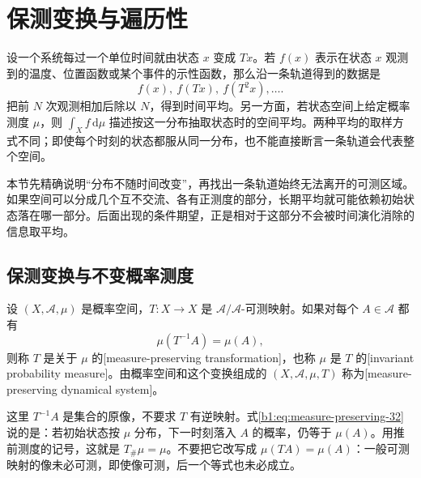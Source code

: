 \section{保测变换与遍历性}
\label{b1:sec:3201}

设一个系统每过一个单位时间就由状态 \(x\) 变成 \(Tx\)。若 \(f(x)\) 表示在状态 \(x\) 观测到的温度、位置函数或某个事件的示性函数，那么沿一条轨道得到的数据是
\[
 f(x),\ f(Tx),\ f(T^2x),\ldots.
\]
把前 \(N\) 次观测相加后除以 \(N\)，得到时间平均。另一方面，若状态空间上给定概率测度 \(\mu\)，则 \(\int_X f\,\mathrm d\mu\) 描述按这一分布抽取状态时的空间平均。两种平均的取样方式不同；即使每个时刻的状态都服从同一分布，也不能直接断言一条轨道会代表整个空间。

\ProseParagraphBreak

本节先精确说明“分布不随时间改变”，再找出一条轨道始终无法离开的可测区域。如果空间可以分成几个互不交流、各有正测度的部分，长期平均就可能依赖初始状态落在哪一部分。后面出现的条件期望，正是相对于这部分不会被时间演化消除的信息取平均。

\subsection{保测变换与不变概率测度}
\label{b1:subsec:320101}

\begin{definition}\label{b1:def:measure-preserving-32}
设 \((X,\mathcal A,\mu)\) 是概率空间，\(T\colon X\rightarrow X\) 是 \(\mathcal A/\mathcal A\)-可测映射。如果对每个 \(A\in\mathcal A\) 都有
\begin{equation}\label{b1:eq:measure-preserving-32}
 \mu(T^{-1}A)=\mu(A),
\end{equation}
则称 \(T\) 是关于 \(\mu\) 的[measure-preserving transformation]，也称 \(\mu\) 是 \(T\) 的[invariant probability measure]。由概率空间和这个变换组成的 \((X,\mathcal A,\mu,T)\) 称为[measure-preserving dynamical system]。
\end{definition}

这里 \(T^{-1}A\) 是集合的原像，不要求 \(T\) 有逆映射。式\eqref{b1:eq:measure-preserving-32}说的是：若初始状态按 \(\mu\) 分布，下一时刻落入 \(A\) 的概率，仍等于 \(\mu(A)\)。用推前测度的记号，这就是 \(T_\#\mu=\mu\)。不要把它改写成 \(\mu(TA)=\mu(A)\)：一般可测映射的像未必可测，即使像可测，后一个等式也未必成立。

\ProseParagraphBreak

